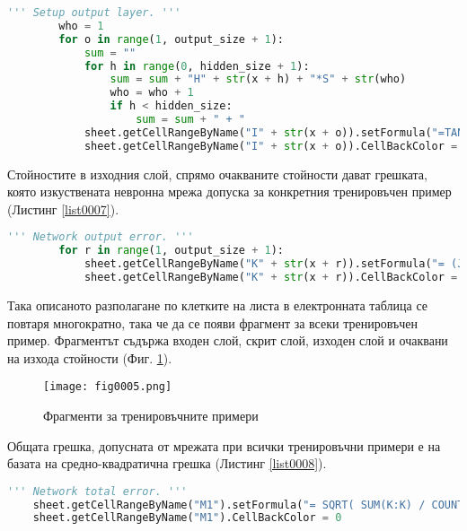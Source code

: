 \begin{lstlisting}[caption=Стойности на изходния слой при правия пас, language=Python, basicstyle=\tiny, label=list0006]
        ''' Setup output layer. '''
        who = 1
        for o in range(1, output_size + 1):
            sum = ""
            for h in range(0, hidden_size + 1):
                sum = sum + "H" + str(x + h) + "*S" + str(who)
                who = who + 1
                if h < hidden_size:
                    sum = sum + " + "
            sheet.getCellRangeByName("I" + str(x + o)).setFormula("=TANH( " + sum + " )")
            sheet.getCellRangeByName("I" + str(x + o)).CellBackColor = (0 << 16 | 255 << 8 | 0)
\end{lstlisting}

Стойностите в изходния слой, спрямо очакваните стойности дават грешката, която изкуствената невронна мрежа допуска за конкретния тренировъчен пример (Листинг \ref{list0007}).

\begin{lstlisting}[caption=Стойност на грешката допусната от мрежата за конкретния пример, language=Python, basicstyle=\tiny, label=list0007]
        ''' Network output error. '''
        for r in range(1, output_size + 1):
            sheet.getCellRangeByName("K" + str(x + r)).setFormula("= (J" + str(x + r) + "-I" + str(x + r) + ") * (J" + str(x + r) + "-I" + str(x + r) + ")")
            sheet.getCellRangeByName("K" + str(x + r)).CellBackColor = (0 << 16 | 255 << 8 | 255)
\end{lstlisting}

Така описаното разполагане по клетките на листа в електронната таблица се повтаря многократно, така че да се появи фрагмент за всеки тренировъчен пример. Фрагментът съдържа входен слой, скрит слой, изходен слой и очаквани на изхода стойности (Фиг. \ref{fig0005}).

\begin{figure}[H]
  \centering
  \texttt{[image: fig0005.png]}
  \caption{Фрагменти за тренировъчните примери}
\label{fig0005}
\end{figure}

Общата грешка, допусната от мрежата при всички тренировъчни примери е на базата на средно-квадратична грешка (Листинг \ref{list0008}).

\begin{lstlisting}[caption=Обща средно-квадратична грешка на мрежата, language=Python, basicstyle=\tiny, label=list0008]
    ''' Network total error. '''
    sheet.getCellRangeByName("M1").setFormula("= SQRT( SUM(K:K) / COUNT(K:K) )")
    sheet.getCellRangeByName("M1").CellBackColor = 0
\end{lstlisting}

